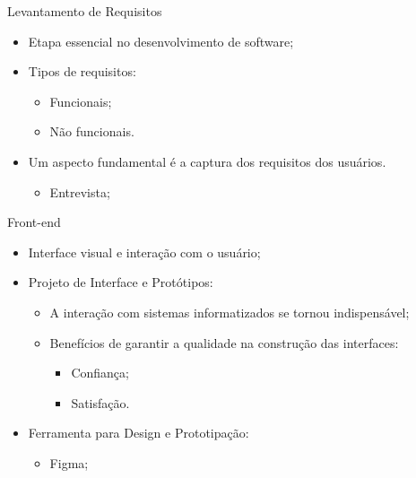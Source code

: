 \begin{frame}{Levantamento de Requisitos}
    \begin{itemize}
        \item Etapa essencial no desenvolvimento de software; \vspace{0.5cm}
        \item Tipos de requisitos: \vspace{0.5cm}
              \begin{itemize}
                  \item Funcionais; \vspace{0.25cm}
                  \item Não funcionais. \vspace{0.5cm}
              \end{itemize}
        \item Um aspecto fundamental é a captura dos requisitos dos usuários. \vspace{0.25cm}
              \begin{itemize}
                  \item Entrevista; \vspace{0.25cm}
              \end{itemize}
    \end{itemize}
\end{frame}

\begin{frame}{Front-end}
    \begin{itemize}
        \item Interface visual e interação com o usuário; \vspace{0.25cm}
        \item Projeto de Interface e Protótipos: \vspace{0.25cm}
              \begin{itemize}
                  \item A interação com sistemas informatizados se tornou indispensável; \vspace{0.25cm}
                  \item Benefícios de garantir a qualidade na construção das interfaces: \vspace{0.25cm}
                        \begin{itemize}
                            \item Confiança; \vspace{0.25cm}
                            \item Satisfação. \vspace{0.25cm}
                        \end{itemize}
              \end{itemize}
        \item Ferramenta para Design e Prototipação: \vspace{0.25cm}
              \begin{itemize}
                  \item Figma; \vspace{0.25cm}
              \end{itemize}
    \end{itemize}
\end{frame}

